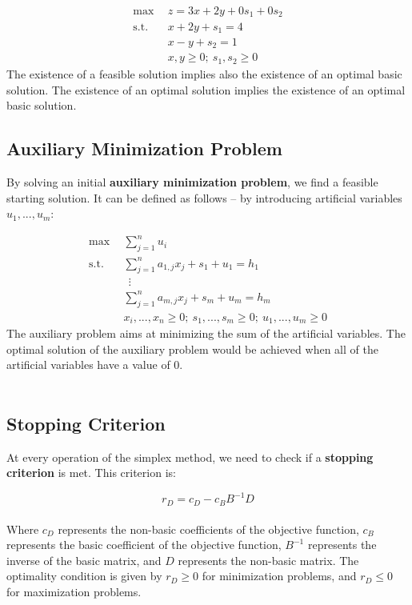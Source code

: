 \documentclass{article}
\begin{document}
\begin{align*}
	\max~~ & z = 3x+2y+0s_1+0s_2 \\
	\text{s.t.}~~ & x+2y+s_1 = 4 \\
	~~& x-y+s_2 = 1 \\
	~~& x,y \geq 0;~ s_1, s_2 \geq 0
\end{align*}
The existence of a feasible solution implies also the existence of an optimal basic solution. The existence of an optimal solution implies the existence of an optimal basic solution.

\subsection{Auxiliary Minimization Problem}
By solving an initial \textbf{auxiliary minimization problem}, we find a feasible starting solution. It can be defined as follows -- by introducing artificial variables $u_1, ..., u_m$:

\begin{align*}
	\max~~ & \sum_{j = 1}^n u_i \\
	\text{s.t.}~~ & \sum_{j = 1}^n a_{1,j}x_j+s_1+u_1 = h_1 \\
	~~&~~ \vdots \\
	~~& \sum_{j = 1}^n a_{m,j}x_j+s_m+u_m = h_m \\
	~~& x_i, ..., x_n \geq 0;~ s_1, ..., s_m \geq 0;~ u_1, ..., u_m \geq 0
\end{align*}
The auxiliary problem aims at minimizing the sum of the artificial variables. The optimal solution of the auxiliary problem would be achieved when all of the artificial variables have a value of 0. \\ \\

\subsection{Stopping Criterion}
At every operation of the simplex method, we need to check if a \textbf{stopping criterion} is met. This criterion is:

\[ r_D = c_D - c_BB^{-1}D \] \\
Where $c_D$ represents the non-basic coefficients of the objective function, $c_B$ represents the basic coefficient of the objective function, $B^{-1}$ represents the inverse of the basic matrix, and $D$ represents the non-basic matrix. The optimality condition is given by $r_D \geq 0$ for minimization problems, and $r_D \leq 0$ for maximization problems. \\ \\
\end{document}
